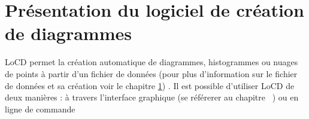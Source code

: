 \chapter{Présentation du logiciel de création de diagrammes}\label{chap:fichDonnees}
LoCD permet la création automatique de diagrammes, histogrammes ou nuages de points à partir d'un fichier de données (pour plus d'information sur le fichier de données et sa création voir le chapitre \ref{chap:fichDonnees})
. Il est possible d'utiliser LoCD de deux manières : à travers l'interface graphique (se référerer au chapitre ~\pageref{chap:usegraph}) ou en ligne de commande%




